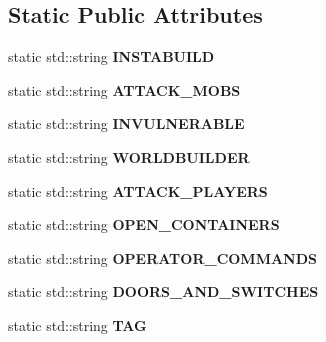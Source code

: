 \subsection*{Static Public Attributes}
\begin{DoxyCompactItemize}
\item 
\mbox{\label{struct_abilities_ab1508e2182f01035c543e93ac1cd9f68}} 
static std\+::string {\bfseries I\+N\+S\+T\+A\+B\+U\+I\+LD}
\item 
\mbox{\label{struct_abilities_ab92a23a2b792332bfa229fc09f4dea54}} 
static std\+::string {\bfseries A\+T\+T\+A\+C\+K\+\_\+\+M\+O\+BS}
\item 
\mbox{\label{struct_abilities_a82fd586d1eb534d48ebfc772d1269225}} 
static std\+::string {\bfseries I\+N\+V\+U\+L\+N\+E\+R\+A\+B\+LE}
\item 
\mbox{\label{struct_abilities_ac396af60dc4f93e5eb8d304af00f4edb}} 
static std\+::string {\bfseries W\+O\+R\+L\+D\+B\+U\+I\+L\+D\+ER}
\item 
\mbox{\label{struct_abilities_a280502d5a4885ce64dd736f1a7ee7c7a}} 
static std\+::string {\bfseries A\+T\+T\+A\+C\+K\+\_\+\+P\+L\+A\+Y\+E\+RS}
\item 
\mbox{\label{struct_abilities_ad16b9ee497a3316ef5b2136839e40620}} 
static std\+::string {\bfseries O\+P\+E\+N\+\_\+\+C\+O\+N\+T\+A\+I\+N\+E\+RS}
\item 
\mbox{\label{struct_abilities_ac3fa502d7f69159adbc74149d2f589c0}} 
static std\+::string {\bfseries O\+P\+E\+R\+A\+T\+O\+R\+\_\+\+C\+O\+M\+M\+A\+N\+DS}
\item 
\mbox{\label{struct_abilities_a38b2df2eb1c5a2816c57f622a2e8e2a1}} 
static std\+::string {\bfseries D\+O\+O\+R\+S\+\_\+\+A\+N\+D\+\_\+\+S\+W\+I\+T\+C\+H\+ES}
\item 
\mbox{\label{struct_abilities_aafbabe85a6be249a26c0effa0bb6c0bb}} 
static std\+::string {\bfseries T\+AG}
\item 
\mbox{\label{struct_abilities_a6d6f311661d1e56f8211f0b00429fcb2}} 

\end{DoxyCompactItemize}
